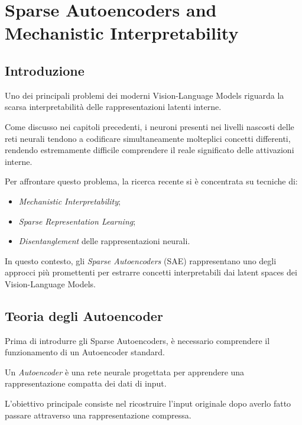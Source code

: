 %
%
\chapter{Sparse Autoencoders and Mechanistic Interpretability}

\section{Introduzione}

Uno dei principali problemi dei moderni Vision-Language Models riguarda la scarsa interpretabilità delle rappresentazioni latenti interne.

Come discusso nei capitoli precedenti, i neuroni presenti nei livelli nascosti delle reti neurali tendono a codificare simultaneamente molteplici concetti differenti, rendendo estremamente difficile comprendere il reale significato delle attivazioni interne.

Per affrontare questo problema, la ricerca recente si è concentrata su tecniche di:

\begin{itemize}
    \item \textit{Mechanistic Interpretability};
    \item \textit{Sparse Representation Learning};
    \item \textit{Disentanglement} delle rappresentazioni neurali.
\end{itemize}

In questo contesto, gli \textit{Sparse Autoencoders} (SAE) rappresentano uno degli approcci più promettenti per estrarre concetti interpretabili dai latent spaces dei Vision-Language Models.

\section{Teoria degli Autoencoder}

Prima di introdurre gli Sparse Autoencoders, è necessario comprendere il funzionamento di un Autoencoder standard.

Un \textit{Autoencoder} è una rete neurale progettata per apprendere una rappresentazione compatta dei dati di input.

L'obiettivo principale consiste nel ricostruire l'input originale dopo averlo fatto passare attraverso una rappresentazione compressa.

